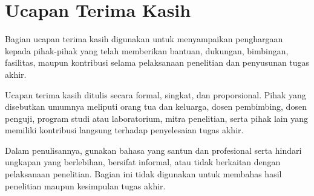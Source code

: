 \chapter*{\textbf{Ucapan Terima Kasih}}

Bagian ucapan terima kasih digunakan untuk menyampaikan penghargaan kepada pihak-pihak yang telah memberikan bantuan, dukungan, bimbingan, fasilitas, maupun kontribusi selama pelaksanaan penelitian dan penyusunan tugas akhir.

Ucapan terima kasih ditulis secara formal, singkat, dan proporsional. Pihak yang disebutkan umumnya meliputi orang tua dan keluarga, dosen pembimbing, dosen penguji, program studi atau laboratorium, mitra penelitian, serta pihak lain yang memiliki kontribusi langsung terhadap penyelesaian tugas akhir.

Dalam penulisannya, gunakan bahasa yang santun dan profesional serta hindari ungkapan yang berlebihan, bersifat informal, atau tidak berkaitan dengan pelaksanaan penelitian. Bagian ini tidak digunakan untuk membahas hasil penelitian maupun kesimpulan tugas akhir.
